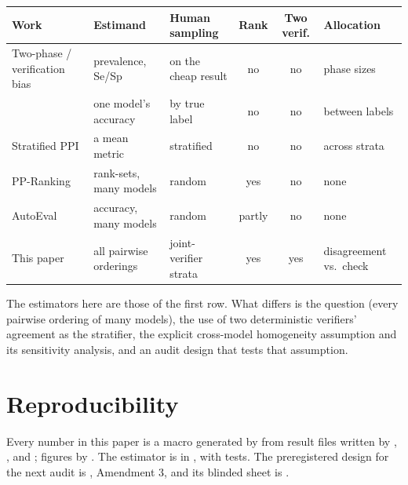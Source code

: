 \begin{center}\footnotesize
\begin{tabular}{@{}p{3.3cm}p{2.3cm}p{2.2cm}ccp{1.9cm}@{}}
\toprule
Work & Estimand & Human sampling & Rank & Two verif. & Allocation \\
\midrule
Two-phase / verification bias \citep{neyman1938contribution,tenenbein1970double,begg1983assessment} & prevalence, Se/Sp & on the cheap result & no & no & phase sizes \\
\citet{lee2026judge} & one model's accuracy & by true label & no & no & between labels \\
Stratified PPI \citep{fisch2024stratified} & a mean metric & stratified & no & no & across strata \\
PP-Ranking \citep{chatzi2024ranking} & rank-sets, many models & random & yes & no & none \\
AutoEval \citep{boyeau2025autoeval} & accuracy, many models & random & partly & no & none \\
This paper & all pairwise orderings & joint-verifier strata & yes & yes & disagreement vs.\ check \\
\bottomrule
\end{tabular}
\end{center}
The estimators here are those of the first row. What differs is the question
(every pairwise ordering of many models), the use of two deterministic
verifiers' agreement as the stratifier, the explicit cross-model homogeneity
assumption and its sensitivity analysis, and an audit design that tests that
assumption.

\section{Reproducibility}
\label{sec:appendix-repro}
\raggedright
Every number in this paper is a macro generated by
 from result files written by
, ,
 and ;
figures by . The estimator is in
, with tests. The preregistered design for the next audit
is , Amendment 3, and its blinded sheet
is .
